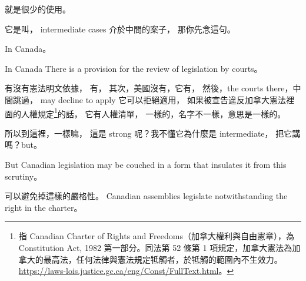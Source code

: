 \hypertarget{w06:cue:934}{}就是很少的使用。

\hypertarget{w06:cue:935}{}它是叫，
\hypertarget{w06:cue:936}{}intermediate cases
\hypertarget{w06:cue:937}{}介於中間的案子，
\hypertarget{w06:cue:938}{}那你先念這句。

\hypertarget{w06:cue:939}{}In Canada。

\hypertarget{w06:cue:940}{}In Canada
\hypertarget{w06:cue:941}{}There is a provision for the review of legislation by courts。

\hypertarget{w06:cue:942}{}有沒有憲法明文依據，
\hypertarget{w06:cue:943}{}有，
\hypertarget{w06:cue:944}{}其次，美國沒有，它有，
\hypertarget{w06:cue:945}{}然後，the courts there，中間跳過，
\hypertarget{w06:cue:946}{}may decline to apply
\hypertarget{w06:cue:947}{}它可以拒絕適用，
\hypertarget{w06:cue:948}{}如果被宣告違反加拿大憲法裡面的人權規定\footnote{指 Canadian Charter of Rights and Freedoms（加拿大權利與自由憲章），為 Constitution Act, 1982 第一部分。同法第 52 條第 1 項規定，加拿大憲法為加拿大的最高法，任何法律與憲法規定牴觸者，於牴觸的範圍內不生效力。\url{https://laws-lois.justice.gc.ca/eng/Const/FullText.html}。}的話，
\hypertarget{w06:cue:949}{}它有人權清單，
\hypertarget{w06:cue:950}{}一樣的，名字不一樣，意思是一樣的。

\hypertarget{w06:cue:951}{}所以到這裡，一樣嘛，
\hypertarget{w06:cue:952}{}這是 strong 呢？我不懂它為什麼是 intermediate，
\hypertarget{w06:cue:953}{}把它講嗎？but。

\hypertarget{w06:cue:954}{}But Canadian legislation may be couched in a form that insulates it from this scrutiny。

\hypertarget{w06:cue:955}{}可以避免掉這樣的嚴格性。
\hypertarget{w06:cue:956}{}Canadian assemblies legislate notwithstanding the right in the charter。

